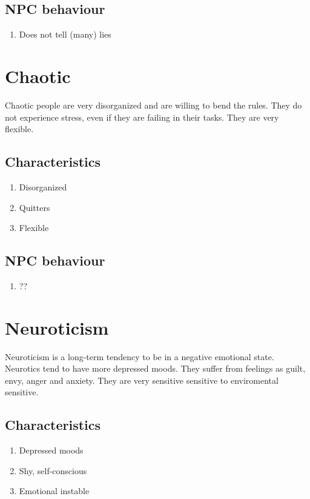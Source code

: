 \documentclass{article}
\begin{document}
\subsection{NPC behaviour}
\begin{enumerate}
\item Does not tell (many) lies
\end{enumerate} 



\section{Chaotic}

Chaotic people are very disorganized and are willing to bend the rules. They do not 
experience stress, even if they are failing in their tasks. They are very flexible. \cite{bigfive}

\subsection{Characteristics}
\begin{enumerate}
\item Disorganized
\item Quitters
\item Flexible 
\end{enumerate} 

\subsection{NPC behaviour}
\begin{enumerate}
\item ??
\end{enumerate} 

\section{Neuroticism}
Neuroticism is a long-term tendency to be in a negative emotional state. Neurotics
tend to have more depressed moods. They suffer from feelings as guilt, envy, anger and anxiety. 
They are very sensitive sensitive to enviromental sensitive. \cite{neuroticism}

\subsection{Characteristics}
\begin{enumerate}
\item Depressed moods
\item Shy, self-conscious
\item Emotional instable
\end{enumerate} 
\end{document}
